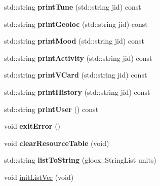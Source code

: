 \begin{DoxyCompactItemize}
\item 
\hypertarget{classDatabase_aacf248f2eefaf9630d5a3330f63a680f}{
std::string {\bfseries printTune} (std::string jid) const }
\label{classDatabase_aacf248f2eefaf9630d5a3330f63a680f}

\item 
\hypertarget{classDatabase_aa7fdaaa4cc61eabaa81178b3689dbd74}{
std::string {\bfseries printGeoloc} (std::string jid) const }
\label{classDatabase_aa7fdaaa4cc61eabaa81178b3689dbd74}

\item 
\hypertarget{classDatabase_aba1e91da98b40211c14a4eea15974548}{
std::string {\bfseries printMood} (std::string jid) const }
\label{classDatabase_aba1e91da98b40211c14a4eea15974548}

\item 
\hypertarget{classDatabase_a13d3f6d42ed491909ca9963bfb4ea68e}{
std::string {\bfseries printActivity} (std::string jid) const }
\label{classDatabase_a13d3f6d42ed491909ca9963bfb4ea68e}

\item 
\hypertarget{classDatabase_af5c88ba96471c2a935b5e2ca7d0a2e5f}{
std::string {\bfseries printVCard} (std::string jid) const }
\label{classDatabase_af5c88ba96471c2a935b5e2ca7d0a2e5f}

\item 
\hypertarget{classDatabase_a8295a029b1700900e0aeb228816638d8}{
std::string {\bfseries printHistory} (std::string jid) const }
\label{classDatabase_a8295a029b1700900e0aeb228816638d8}

\item 
\hypertarget{classDatabase_a5d733ffa13f136481e3dbdabc9b9ce99}{
std::string {\bfseries printUser} () const }
\label{classDatabase_a5d733ffa13f136481e3dbdabc9b9ce99}

\item 
\hypertarget{classDatabase_ae59c31d44f6b09b22edc7173f0d7f18d}{
void {\bfseries exitError} ()}
\label{classDatabase_ae59c31d44f6b09b22edc7173f0d7f18d}

\item 
\hypertarget{classDatabase_a84791e2489f1aace2bfba61e6e5fdd77}{
void {\bfseries clearResourceTable} (void)}
\label{classDatabase_a84791e2489f1aace2bfba61e6e5fdd77}

\item 
\hypertarget{classDatabase_af8cc000733b73f596f49a0c4a65637ff}{
std::string {\bfseries listToString} (gloox::StringList units)}
\label{classDatabase_af8cc000733b73f596f49a0c4a65637ff}

\item 
void \hyperlink{classDatabase_a94ac4a7584707bfd40643e437e7471a8}{initListVer} (void)
\end{DoxyCompactItemize}
